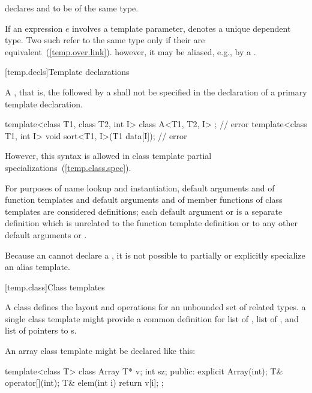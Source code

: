 declares  and  to be of the same type.
\exitexample

\pnum
If an expression $e$ involves a template parameter, 
denotes a unique dependent type. Two such 
refer to the same type only if their  are
equivalent~(\ref{temp.over.link}). \enternote however, it may be aliased,
e.g., by a . \exitnote

[temp.decls]{Template declarations}

\pnum
A
,
that is, the
followed by a
shall not be specified in the declaration of a primary template declaration.
\enterexample

\begin{codeblock}
template<class T1, class T2, int I> class A<T1, T2, I> { };     // error
template<class T1, int I> void sort<T1, I>(T1 data[I]);         // error
\end{codeblock}
\exitexample
\enternote
However, this syntax is allowed in class template partial specializations~(\ref{temp.class.spec}).
\exitnote

\pnum
For purposes of name lookup and instantiation,
default arguments and  of function
templates and default arguments and  of
member functions of class templates are considered definitions;
each default argument or  is a separate
definition which is unrelated to
the function template definition or to any other default arguments or
.

\pnum
Because an  cannot declare a
, it is not possible to partially or
explicitly specialize an alias template.

[temp.class]{Class templates}

\pnum
A class
defines the layout and operations
for an unbounded set of related types.
\enterexample
a single class template
might provide a common definition for
list of
,
list of
,
and list of pointers to
s.
\exitexample

\enterexample
An array class template might be declared like this:

\begin{codeblock}
template<class T> class Array {
  T* v;
  int sz;
public:
  explicit Array(int);
  T& operator[](int);
  T& elem(int i) { return v[i]; }
};
\end{codeblock}

